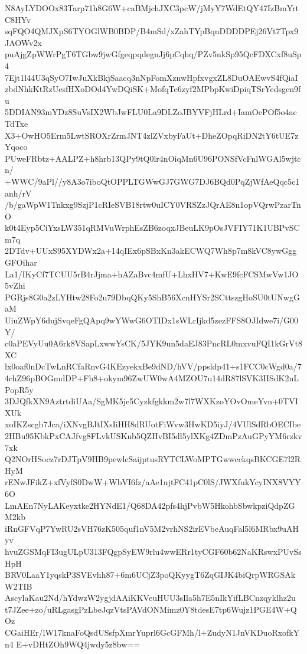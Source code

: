 N8AyLYDOOx83Tarp71h8G6W+caBMjchJXC3pcW/jMyY7WdEtQY47IzBmYrtC8HYv
sqFQO4QMJXpS6TYOGlWB0BDP/B4mSd/xZahTYpBqnDDDDPEj26Vt7Tpx9JAOWv2x
puAjgZpWWrPgT6TGbw9jwGfgeqpqdegnJj6pCqhq/PZv5nkSp95QcFDXCxf8uSp4
7Ejt1l44U3qSyO7IwJuXkBkjSaacq3nNpFomXznwHpfxvgxZL8DuOAEwvS4fQiaI
zbdNhkKtRzUesfHXoDOd4YwDQiSK+MofqTe6zyf2MPbpKwiDpiqTSrYedsgcn9fu
5DDIAN93mYDz8SuVsIX2WbJwFLU0La9DLZoJBYVFjHLrd+IamOePOf5o4acTdTxe
X3+OwHO5Erm5LwtSROXrZrmJNT4zlZVxbyFaUt+DheZOpqRiDN2tY6tUE7zYqoco
PUweFRbtz+AALPZ+h8hrb13QPy9tQ0lr4nOiqMn6U96PONSfVcFnlWGAl5wjtcn/
+WWC/9aPl//y8A3o7iboQtOPPLTGWwGJ7GWG7DJ6BQd0PqZjWfAeQqc5c1anh/rV
/b/gaWpW1Tnkxg9SzjP1cRIeSVB18rtw0uICY0VRSZzJQrAE8n1opVQrwPzarTnO
k0t4Eyp5CiYxsLW351qRMVuWrphEsZB6zoqxJBeuLK9pOsJVFIY71K1UBPvSCm7q
2DTdv+UUxS95XYDWx2a+14qIEx6pSBxKn3akECWQ7Wh8p7m8kVC8ywGggGFOihar
La1/IKyCf7TCUU5rB4rJjma+hAZaBvc4mfU+LhxHV7+KwE9fcFCSMwVw1JO5vZhi
PGRjs8G0a2zLYHtw28Fo2u79DbqQKy5ShB56XcnHYSr2SCttszgHoSU0tUNwgGaM
UiuZWpY6dujSvqeFgQApq9wYWwG6OTIDx1sWLrIjkd5zezFFS8OJIdwe7i/G00Y/
c0aPEVyUu0A6rk8VSapLxwwYsCK/5JYK9un5daEJ83PncRL0mxvuFQI1kGrVt8XC
lx0oaf0nDcTwLnRCfaRnvG4KEzyekxBe9dND/hVV/ppsldp41+s1FCC0cWgd0a/7
4chZ96pBOGmdDP+Fh8+okym96ZwUW0wA4MZOU7u14dR87lSVK3IISdK2nLPopR5y
3DJQfkXN9AztrtdiUAa/SgMK5je5Cyzkfgkkm2w7l7WXKzoYOvOmeYvn+0TVIXUk
xoIKZscgb7Jca/iXNvgBJtIXsIiHH8dRUotFiWvw3HwKD5iyJ/4VUlSdRbOECIbe
2HBu95KbkPxCAJfvg8FLvkUSKnb5QZHvBI5dl5ylXKg4ZDmPzAuGPyYM6rzkv7xk
Q2NOrHSocz7rDJTpV9HB9pewlcSaijptusRYTCLWoMPTGwwcckqsBKCGE7l2RHyM
rENwJFikZ+xfVyfS0DwW+WbVI6fz/aAe1ujtFC41pC0lS/JWXfukYcyINX8VYY6O
LmAEn7NyLAKeyxtke2HYNdE1/Q68DA42pfs4hjPvbW5HkohbSbwkpziQdpZGM2kb
iRnGFVqP7YwRU2sVH76zK505quf1nV5M2vrhNS2irEVbeAuqFal5l6MRbx9uAHyv
hvuZGSMqFI3ugULpU313FQgpSyEW9rlu4wwERr1tyCGF60b62NaKRswxPUvSsHpH
BRV0LaaY1yqskP3SVEvhh87+6m6UCjZ3poQKyygT6ZqGIJK4biQrpWRGSAkW2TIB
AscylaKau2Nd/hYdwzW2ygjdAAiKKVeuHUU3sIla5h7E5nIkYifLBCnzqyklhz2u
t7JZee+zo/uRLgasgPzLbeJqzVtsPAVdONMimz0Y8tdesE7tp6Wujz1PGE4W+QOz
CGaiHEr/lW17knaFoQsdUSsfpXmrYuprl6GcGFMh/l+ZudyN1JnVKDuoRxofkYn4
E+vDHtZOh9WQ4jwdy5z8bw==
